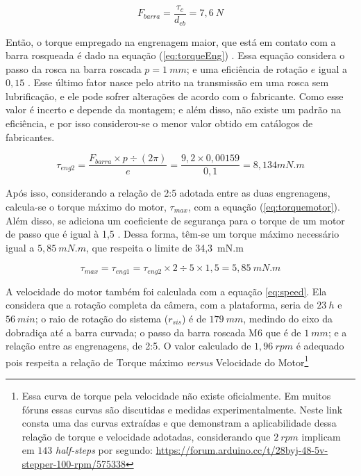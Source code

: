 \begin{equation}
	F_{barra} = \dfrac{\tau_{c}}{d_{eb}}= 7,6~N
	\label{eq:forcaBarra}
\end{equation}

Então, o torque empregado na engrenagem maior, que está em contato com a barra rosqueada é dado na equação (\ref{eq:torqueEng}) \cite{}. Essa equação considera o passo da rosca na barra roscada $ p = 1~mm $; e uma eficiência de rotação $ e $ igual a $ 0,15 $ \cite{man:pcblinear}. Esse último fator nasce pelo atrito na transmissão em uma rosca sem lubrificação, e ele pode sofrer alterações de acordo com o fabricante. Como esse valor é incerto e depende da montagem; e além disso, não existe um padrão na eficiência, e por isso considerou-se o menor valor obtido em catálogos de fabricantes. 

\begin{equation}
	\tau_{eng2} = \dfrac{F_{barra}\times p\div (2\pi)}{e} = \dfrac{9,2 \times 0,00159}{0,1} = 8,134 mN.m 
	\label{eq:torqueEng}
\end{equation}

Após isso, considerando a relação de 2:5 adotada entre as duas engrenagens, calcula-se o torque máximo do motor, $ \tau_{max} $, com a equação (\ref{eq:torquemotor}). Além disso, se adiciona um coeficiente de segurança para o torque de um motor de passo que é igual à 1,5 \cite{man:sizemotor}. Dessa forma, têm-se um torque máximo necessário igual a $ 5,85~mN.m $, que respeita o limite de 34,3~mN.m


\begin{equation}
	\tau_{max} = \tau_{eng1} = \tau_{eng2} \times 2 \div 5 \times 1,5 = 5,85 ~mN.m
	\label{eq:torquemotor}
\end{equation}


A velocidade do motor também foi calculada com a equação \ref{eq:speed}. Ela considera que a rotação completa da câmera, com a plataforma, seria de $ 23~h $ e $ 56~min $; o raio de rotação do sistema ($ r_{sis} $)  é de $ 179~mm $, medindo do eixo da dobradiça até a barra curvada; o passo da barra roscada M6 que é de $ 1~mm $; e a relação entre as engrenagens, de 2:5. O valor calculado de $ 1,96~rpm $ é adequado pois respeita a relação de Torque máximo \textit{versus} Velocidade do Motor\footnote{Essa curva de torque pela velocidade não existe oficialmente. Em muitos fóruns essas curvas são discutidas e medidas experimentalmente. Neste link consta uma das curvas extraídas e que demonstram a aplicabilidade dessa relação de torque e velocidade adotadas, considerando que $ 2~rpm $ implicam em $ 143 $ \textit{half-steps} por segundo: \url{https://forum.arduino.cc/t/28byj-48-5v-stepper-100-rpm/575338}} 

